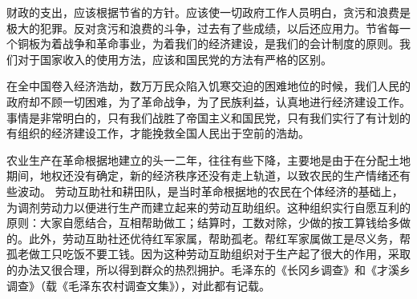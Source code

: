 财政的支出，应该根据节省的方针。应该使一切政府工作人员明白，贪污和浪费是极大的犯罪。反对贪污和浪费的斗争，过去有了些成绩，以后还应用力。节省每一个铜板为着战争和革命事业，为着我们的经济建设，是我们的会计制度的原则。我们对于国家收入的使用方法，应该和国民党的方法有严格的区别。

在全中国卷入经济浩劫，数万万民众陷入饥寒交迫的困难地位的时候，我们人民的政府却不顾一切困难，为了革命战争，为了民族利益，认真地进行经济建设工作。事情是非常明白的，只有我们战胜了帝国主义和国民党，只有我们实行了有计划的有组织的经济建设工作，才能挽救全国人民出于空前的浩劫。


\begin{maonote}
农业生产在革命根据地建立的头一二年，往往有些下降，主要地是由于在分配土地期间，地权还没有确定，新的经济秩序还没有走上轨道，以致农民的生产情绪还有些波动。
劳动互助社和耕田队，是当时革命根据地的农民在个体经济的基础上，为调剂劳动力以便进行生产而建立起来的劳动互助组织。这种组织实行自愿互利的原则：大家自愿结合，互相帮助做工；结算时，工数对除，少做的按工算钱给多做的。此外，劳动互助社还优待红军家属，帮助孤老。帮红军家属做工是尽义务，帮孤老做工只吃饭不要工钱。因为这种劳动互助组织对于生产起了很大的作用，采取的办法又很合理，所以得到群众的热烈拥护。毛泽东的《长冈乡调查》和《才溪乡调查》（载《毛泽东农村调查文集》），对此都有记载。
\end{maonote}
